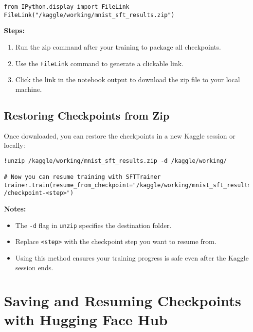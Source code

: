 \documentclass[a4paper, 12pt]{article}
\begin{document}
\begin{tcolorbox}[colback=green!5!white, colframe=green!75!black, title=Download Example]
\begin{verbatim}
from IPython.display import FileLink
FileLink("/kaggle/working/mnist_sft_results.zip")
\end{verbatim}
\end{tcolorbox}

\textbf{Steps:}
\begin{enumerate}
    \item Run the zip command after your training to package all checkpoints.
    \item Use the \texttt{FileLink} command to generate a clickable link.
    \item Click the link in the notebook output to download the zip file to your local machine.
\end{enumerate}

\subsection*{Restoring Checkpoints from Zip}

Once downloaded, you can restore the checkpoints in a new Kaggle session or locally:

\begin{tcolorbox}[colback=blue!5!white, colframe=blue!75!black, title=Restore Example]
\begin{verbatim}
!unzip /kaggle/working/mnist_sft_results.zip -d /kaggle/working/

# Now you can resume training with SFTTrainer
trainer.train(resume_from_checkpoint="/kaggle/working/mnist_sft_results
/checkpoint-<step>")
\end{verbatim}
\end{tcolorbox}

\textbf{Notes:}
\begin{itemize}
    \item The \texttt{-d} flag in \texttt{unzip} specifies the destination folder.
    \item Replace \texttt{<step>} with the checkpoint step you want to resume from.
    \item Using this method ensures your training progress is safe even after the Kaggle session ends.
\end{itemize}

\newpage
\section*{Saving and Resuming Checkpoints with Hugging Face Hub}
\end{document}
